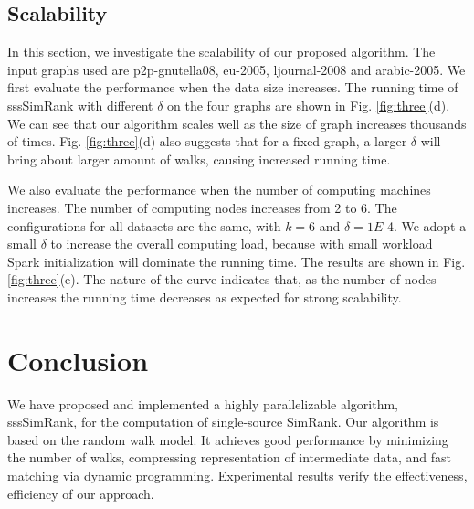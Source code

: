 \documentclass[conference]{IEEEtran}
\theoremstyle{definition}
\theoremstyle{definition}
\begin{document}
\subsection{Scalability}
In this section, we investigate the scalability of our proposed algorithm.
The input graphs used are p2p-gnutella08, eu-2005, ljournal-2008 and arabic-2005.
We first evaluate the performance when the data size increases. 
The running time of sssSimRank with different $\delta$ on the four graphs are shown in Fig. \ref{fig:three}(d).
We can see that our algorithm scales well as the size of  graph increases thousands of times.
Fig. \ref{fig:three}(d) also suggests that for a fixed graph, a larger $\delta$ will bring about larger amount of walks, causing increased running time.

We also evaluate the performance when the number of computing machines increases.
The number of computing nodes increases from 2 to 6.
The configurations for all datasets are the same, with $k=6$ and $\delta=1E$-4.
We adopt a small $\delta$ to increase the overall computing load, because with small workload Spark initialization will dominate the running time.
The results are shown in Fig. \ref{fig:three}(e).
The  nature  of  the  curve  indicates  that,  as  the  number of nodes increases  the running  time decreases as  expected for strong  scalability.
\iffalse
\begin{figure}[t]
\centering
  \begin{subfigure}[t]{\linewidth}
\texttt{[image: resource/graph/data\_scalability.eps]} 
    \caption{Running time with different graph sizes.}
    \label{fig:1}
  \end{subfigure}
  \begin{subfigure}[t]{\linewidth}
\texttt{[image: resource/graph/node\_scalability.eps]} 
    \caption{Running time with different number of nodes.}
    \label{fig:2}
  \end{subfigure}
      \caption{Data scalability and node scalability. }
    \label{fig:five}
\end{figure}
\fi

\section{Conclusion}
We have proposed and implemented a highly parallelizable algorithm, sssSimRank, for the computation of single-source SimRank. 
Our algorithm is based on the random walk model. 
It achieves good performance by minimizing the number of walks, compressing representation of intermediate data, and fast matching via dynamic programming.
Experimental results verify the effectiveness, efficiency of our approach. 
\end{document}
